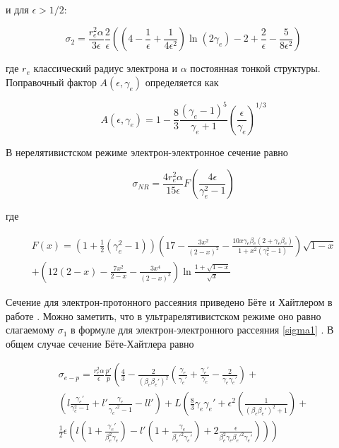 и для $\epsilon > 1/2$:

\begin{equation}
	\sigma_2 = \frac{r_e^2\alpha}{3\epsilon}\frac{2}{\epsilon}\left(\left(4-\frac{1}{\epsilon}+\frac{1}{4\epsilon^2}\right)\ln\left(2\gamma_e\right)-2+\frac{2}{\epsilon}-\frac{5}{8\epsilon^2}\right)
\end{equation}

где $r_e$ классический радиус электрона и $\alpha$ постоянная тонкой структуры. Поправочный фактор $A(\epsilon, \gamma_e)$ определяется как

\begin{equation}
	A\left(\epsilon, \gamma_e\right)=1-\frac{8}{3}\frac{\left(\gamma_e-1\right)^5}{\gamma_e + 1}\left(\frac{\epsilon}{\gamma_e}\right)^{1/3}
\end{equation}

В нерелятивистском режиме электрон-электронное сечение равно

\begin{equation}
	\sigma_{NR}=\frac{4r_e^2\alpha}{15\epsilon}F\left(\frac{4\epsilon}{\gamma_e^2-1}\right)
\end{equation}

где

\begin{equation}
	\begin{split}
		F(x) = \left(1+\frac{1}{2}\left(\gamma_e^2-1\right)\right)\left(17-\frac{3x^2}{\left(2-x\right)^2}-\frac{10x\gamma_e\beta_e\left(2+\gamma_e\beta_e\right)}{1+x^2\left(\gamma_e^2-1\right)}\right)\sqrt{1-x} \\ +\left(12\left(2-x\right)-\frac{7x^2}{2-x}-\frac{3x^4}{\left(2-x\right)^3}\right)\ln\frac{1+\sqrt{1-x}}{\sqrt{x}}
	\end{split}
\end{equation}

Сечение для электрон-протонного рассеяния приведено Бёте и Хайтлером в работе \cite{BetheHeitler}. Можно заметить, что в ультрарелятивистском режиме оно равно слагаемому $\sigma_1$ в формуле для электрон-электронного рассеяния \ref{sigma1} \cite{JauchRohrlich}. В общем случае сечение Бёте-Хайтлера равно

\begin{equation}
	\begin{split}
		\sigma_{e-p} = \frac{r_e^2\alpha}{\epsilon}\frac{p'}{p}\left(\frac{4}{3}-\frac{2}{\left(\beta_e\beta_e'\right)^2}\left(\frac{\gamma_e}{\gamma_e'}+\frac{\gamma_e'}{\gamma_e}-\frac{2}{\gamma_e\gamma_e'}\right) + \right. \\ \left. \left(l\frac{\gamma_e'}{\gamma_e^2-1}+l'\frac{\gamma_e}{\gamma_e'^2-1}-l l'\right) + L\left(\frac{8}{3}\gamma_e\gamma_e'+\epsilon^2\left(\frac{1}{\left(\beta_e\beta_e'\right)^2+1}\right)+ \right. \right. \\ \left. \left. \frac{1}{2}\epsilon\left(l\left(1+\frac{\gamma_e'}{\beta_e^2\gamma_e}\right)-l'\left(1+\frac{\gamma_e}{\beta_e'^2\gamma_e'}\right)+2\frac{\epsilon}{\beta_e^2\gamma_e\beta_e'^2\gamma_e'}\right)\right)\right)
	\end{split}
\end{equation}

